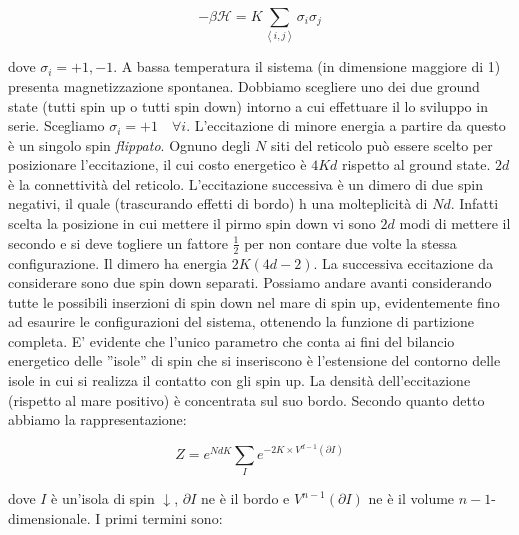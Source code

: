 \documentclass[12pt,a4paper]{article}
\begin{document}
\begin{equation}
-\beta \mathcal{H} = K \sum_{\left< i, j \right>} \sigma_i \sigma_j
\end{equation}

dove $\sigma_{i} = {+1, -1}$. A bassa temperatura il sistema (in dimensione maggiore di 1) presenta magnetizzazione spontanea. Dobbiamo scegliere uno dei due ground state (tutti spin up o tutti spin down) intorno a cui effettuare il lo sviluppo in serie. Scegliamo $\sigma_i = +1 \quad \forall i$. L'eccitazione di minore energia a partire da questo è un singolo spin \emph{flippato}. Ognuno degli $N$ siti del reticolo può essere scelto per posizionare l'eccitazione, il cui costo energetico è $4Kd$ rispetto al ground state. $2d$ è la connettività del reticolo. L'eccitazione successiva è un dimero di due spin negativi, il quale (trascurando effetti di bordo) h una molteplicità di $Nd$. Infatti scelta la posizione in cui mettere il pirmo spin down vi sono $2d$ modi di mettere il secondo e si deve togliere un fattore $\frac{1}{2}$ per non contare due volte la stessa configurazione. Il dimero ha energia $2 K \left( 4 d -2 \right)$. La successiva eccitazione da considerare sono due spin down separati. Possiamo andare avanti considerando tutte le possibili inserzioni di spin down nel mare di spin up, evidentemente fino ad esaurire le configurazioni del sistema, ottenendo la funzione di partizione completa. E' evidente che l'unico parametro che conta ai fini del bilancio energetico delle ''isole'' di spin che si inseriscono è l'estensione del contorno delle isole in cui si realizza il contatto con gli spin up. La densità dell'eccitazione (rispetto al mare positivo) è concentrata sul suo bordo. Secondo quanto detto abbiamo la rappresentazione:


\begin{equation}
Z = e^{N d K} \sum_{I} e^{- 2 K \times V^{d-1} \left( \partial I \right) }
\end{equation}

dove $I$ è un'isola di spin $\downarrow$, $\partial  I$ ne è il bordo e  $ V^{n-1} \left( \partial I \right)$ ne è il volume $n-1$-dimensionale. I primi termini sono:
\end{document}
